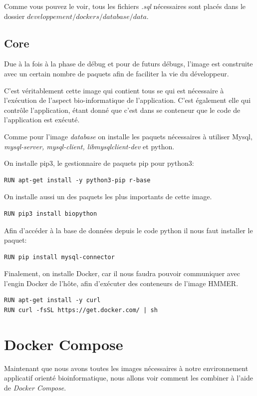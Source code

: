 Comme vous pouvez le voir, tous les fichiers \emph{.sql} nécessaires sont placés dans le dossier \emph{$developpement/dockers/database/data$}.


\subsection{Core}
Due à la fois à la phase de débug et pour de futurs débugs, l'image est construite avec un certain nombre de paquets afin de faciliter la vie du développeur.

C'est véritablement cette image qui contient tous se qui est nécessaire à l'exécution de l'aspect bio-informatique de l'application. C'est également elle qui contrôle l'application, étant donné que c’est dans se conteneur que le code de l'application est exécuté.

Comme pour l'image \emph{database} on installe les paquets nécessaires à utiliser Mysql, \emph{mysql-server, mysql-client, libmysqlclient-dev} et python.

On installe pip3, le gestionnaire de paquets pip pour python3:

\begin{lstlisting}[frame=single]
RUN apt-get install -y python3-pip r-base
\end{lstlisting}

On installe aussi un des paquets les plus importants de cette image.

\begin{lstlisting}[frame=single]
RUN pip3 install biopython
\end{lstlisting}

Afin d'accéder à la base de données depuis le code python il nous faut installer le paquet:

\begin{lstlisting}[frame=single]
RUN pip install mysql-connector
\end{lstlisting}

Finalement, on installe Docker, car il nous faudra pouvoir communiquer avec l'engin Docker de l'hôte, afin d'exécuter des conteneurs de l'image HMMER.

\begin{lstlisting}[frame=single]
RUN apt-get install -y curl
RUN curl -fsSL https://get.docker.com/ | sh
\end{lstlisting}


\section{Docker Compose}
Maintenant que nous avons toutes les images nécessaires à notre environnement applicatif orienté bioinformatique, nous allons voir comment les combiner à l'aide de \emph{Docker Compose}.

